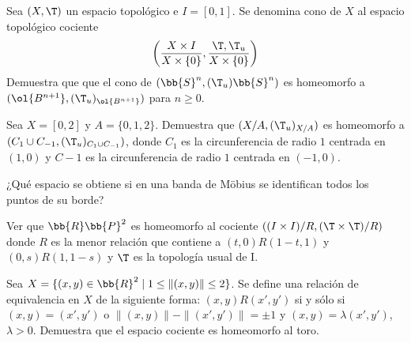 \begin{ejercicio}
    Sea $(X,\T)$ un espacio topológico e $I = [0, 1]$. Se denomina cono de $X$ al espacio topológico cociente
    \begin{equation*}
        \left(\frac{X\times I}{X\times \{0\}},\frac{\T,\T_u}{X\times \{0\}}\right)
    \end{equation*}
    Demuestra que que el cono de $(\bb{S}^n,(\T_u)\bb{S}^n)$ es homeomorfo a $(\ol{B^{n+1}},(\T_u)_{\ol{B^{n+1}}})$ para $n \geq 0$.
\end{ejercicio}

\begin{ejercicio}
    Sea $X = [0, 2]$ y $A = \{0, 1, 2\}$. Demuestra que $(X/A,(\T_u)_{X/A})$ es homeomorfo a $(C_1 \cup C_{-1},(\T_u)_{C_1 \cup C_{-1}})$, donde $C_1$ es la circunferencia de radio $1$ centrada en $(1, 0)$ y $C-1$ es la circunferencia de radio $1$ centrada en $(-1, 0)$.
\end{ejercicio}

\begin{ejercicio}
    ¿Qué espacio se obtiene si en una banda de Möbius se identifican todos los puntos de su borde?
\end{ejercicio}

\begin{ejercicio}
    Ver que $\bb{R}\bb{P}^2$ es homeomorfo al cociente $((I \times I)/R,(\T \times \T )/R)$ donde $R$ es la menor relación que contiene a $(t, 0)R(1 - t, 1)$ y $(0, s)R(1, 1 - s)$ y $\T$ es la topología usual de I.
\end{ejercicio}

\begin{ejercicio}
    Sea $X = \{(x, y) \in \bb{R}^2\mid 1 \leq \|(x, y)\| \leq 2\}$. Se define una relación de equivalencia en $X$ de la siguiente forma: $(x, y)R(x', y')$ si y sólo si $(x, y) = (x', y')$ o $\|(x, y)\| - \|(x', y')\| = \pm 1$ y $(x, y) = \lambda(x', y')$, $\lambda > 0$. Demuestra que el espacio cociente es homeomorfo al toro.
\end{ejercicio}